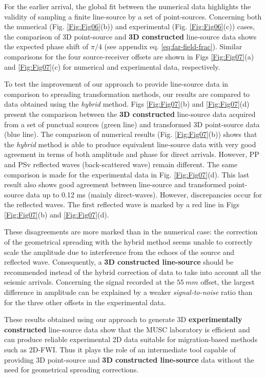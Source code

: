 \documentclass[extra,mreferee]{gji}
\newenvironment{violetnote}{\par\color{BlueViolet}}{\par}
\begin{document}
\begin{violetnote}
For the earlier arrival, the global fit between the numerical data highlights the validity of sampling a finite line-source by a set of point-sources. Concerning both the numerical (Fig. \ref{Fig:Fig06}(b)) and experimental (Fig. \ref{Fig:Fig06}(c)) cases, the comparison of 3D point-source and \textbf{3D constructed} line-source data shows the expected phase shift of $\pi/4$ (see appendix eq. \ref{eq:far-field-frac}). Similar comparisons for the four source-receiver offsets are shown in Figs \ref{Fig:Fig07}(a) and \ref{Fig:Fig07}(c) for numerical and experimental data, respectively.

To test the improvement of our approach to provide line-source data in comparison to spreading transformation methods, our results are compared to data obtained using the \textit{hybrid} method. Figs \ref{Fig:Fig07}(b) and \ref{Fig:Fig07}(d) present the comparison between the \textbf{3D constructed} line-source data acquired from a set of punctual sources (green line) and transformed 3D point-source data (blue line). The comparison of numerical results (Fig. \ref{Fig:Fig07}(b)) shows that the \textit{hybrid} method is able to produce equivalent line-source data with very good agreement in terms of both amplitude and phase for direct arrivals. However, PP and PSv reflected waves (back-scattered wave) remain different. The same comparison is made for the experimental data in Fig. \ref{Fig:Fig07}(d). This last result also shows good agreement between line-source and transformed point-source data up to 0.12 ms (mainly direct-waves). However, discrepancies occur for the reflected waves. The first reflected wave is marked by a red line in Figs \ref{Fig:Fig07}(b) and \ref{Fig:Fig07}(d).

These disagreements are more marked than in the numerical case: the correction of the geometrical spreading with the hybrid method seems unable to correctly scale the amplitude due to interference from the echoes of the source and reflected wave. Consequently, a \textbf{3D constructed line-source} should be recommended instead of the hybrid correction of data to take into account all the seismic arrivals. Concerning the signal recorded at the $55\ mm$ offset, the largest difference in amplitude can be explained by a weaker \textit{signal-to-noise} ratio than for the three other offsets in the experimental data. 

These results obtained using our approach to generate 3D  \textbf{experimentally constructed} line-source data show that the MUSC laboratory is efficient and can produce reliable experimental 2D data suitable for migration-based methods such as 2D-FWI. Thus it plays the role of an intermediate tool capable of providing 3D point-source and \textbf{3D constructed line-source} data without the need for geometrical spreading corrections.
\end{violetnote}
\end{document}
